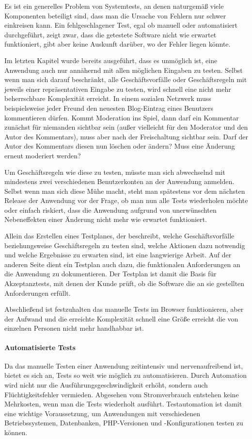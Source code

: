 Es ist ein generelles Problem von Systemtests, an denen naturgemäß viele Komponenten beteiligt sind, dass man die Ursache von Fehlern nur schwer einkreisen kann. Ein fehlgeschlagener Test, egal ob manuell oder automatisiert durchgeführt, zeigt zwar, dass die getestete Software nicht wie erwartet funktioniert, gibt aber keine Auskunft darüber, wo der Fehler liegen könnte.

Im letzten Kapitel wurde bereits ausgeführt, dass es unmöglich ist, eine Anwendung auch nur annähernd mit allen möglichen Eingaben zu testen. Selbst wenn man sich darauf beschränkt, alle Geschäftsvorfälle oder Geschäftsregeln mit jeweils einer repräsentativen Eingabe zu testen, wird schnell eine nicht mehr beherrschbare Komplexität erreicht. In einem sozialen Netzwerk muss beispielsweise jeder Freund den neuesten Blog-Eintrag eines Benutzers kommentieren dürfen. Kommt Moderation ins Spiel, dann darf ein Kommentar zunächst für niemanden sichtbar sein (außer vielleicht für den Moderator und den Autor des Kommentars), muss aber nach der Freischaltung sichtbar sein. Darf der Autor des Kommentars diesen nun löschen oder ändern? Muss eine Änderung erneut moderiert
werden?

Um Geschäftsregeln wie diese zu testen, müsste man sich abwechselnd mit mindestens zwei verschiedenen Benutzerkonten an der Anwendung anmelden. Selbst wenn man sich diese Mühe macht, steht man spätestens vor dem nächsten Release der Anwendung vor der Frage, ob man nun alle Tests wiederholen möchte oder einfach riskiert, dass die Anwendung aufgrund von unerwünschten Nebeneffekten einer Änderung nicht mehr wie erwartet funktioniert.

Allein das Erstellen eines Testplanes, der beschreibt, welche Geschäftsvorfälle beziehungsweise
Geschäftsregeln zu testen sind, welche Aktionen dazu notwendig und welche Ergebnisse zu
erwarten sind, ist eine langwierige Arbeit. Auf der anderen Seite dient ein Testplan
auch dazu, die funktionalen Anforderungen an die Anwendung zu dokumentieren. Der Testplan ist damit die Basis für Akzeptanztests, mit denen der Kunde prüft, ob die Software die an sie gestellten Anforderungen erfüllt.

Abschließend ist festzuhalten das manuelle Tests im Browser funktionieren, aber der Aufwand und die erreichte Komplexität schnell eine Größe erreicht die von einzelnen Personen nicht mehr handhabbar ist. 

\paragraph{Automatisierte Tests}
Da das manuelle Testen einer Anwendung zeitintensiv und nervenaufreibend ist, bietet es sich an, Tests so weit wie möglich zu automatisieren. Durch Automation wird nicht nur die Ausführungsgeschwindigkeit erhöht, sondern auch Flüchtigkeitsfehler vermieden. Abgesehen vom Stromverbrauch entstehen keine Mehrkosten, wenn man die Tests wiederholt ausführt. Testautomation ist damit eine wichtige Voraussetzung, um Anwendungen mit verschiedenen Betriebssystemen, Datenbanken, PHP-Versionen und -Konfigurationen testen zu können.

